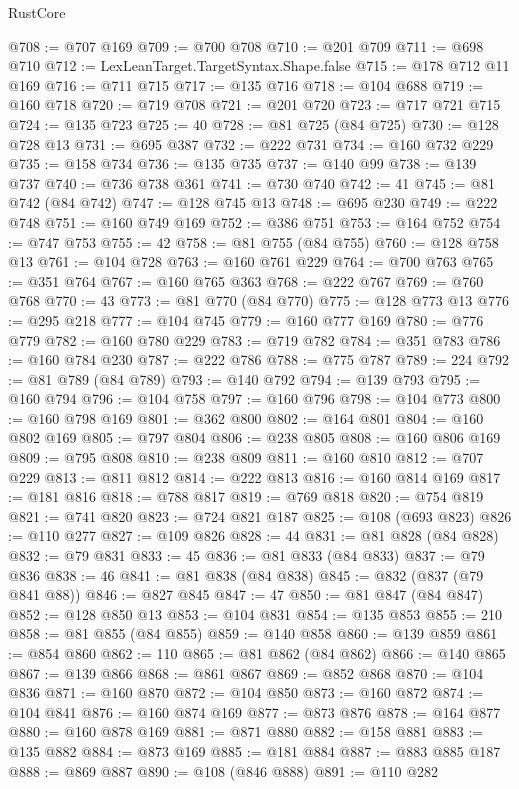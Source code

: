 \begin{lexlean}{RustCore}
\begin{coremodule}
@708 := @707 @169
@709 := @700 @708
@710 := @201 @709
@711 := @698 @710
@712 := LexLeanTarget.TargetSyntax.Shape.false
@715 := @178 @712 @11 @169
@716 := @711 @715
@717 := @135 @716
@718 := @104 @688
@719 := @160 @718
@720 := @719 @708
@721 := @201 @720
@723 := @717 @721 @715
@724 := @135 @723
@725 := 40
@728 := @81 @725 (@84 @725)
@730 := @128 @728 @13
@731 := @695 @387
@732 := @222 @731
@734 := @160 @732 @229
@735 := @158 @734
@736 := @135 @735
@737 := @140 @99
@738 := @139 @737
@740 := @736 @738 @361
@741 := @730 @740
@742 := 41
@745 := @81 @742 (@84 @742)
@747 := @128 @745 @13
@748 := @695 @230
@749 := @222 @748
@751 := @160 @749 @169
@752 := @386 @751
@753 := @164 @752
@754 := @747 @753
@755 := 42
@758 := @81 @755 (@84 @755)
@760 := @128 @758 @13
@761 := @104 @728
@763 := @160 @761 @229
@764 := @700 @763
@765 := @351 @764
@767 := @160 @765 @363
@768 := @222 @767
@769 := @760 @768
@770 := 43
@773 := @81 @770 (@84 @770)
@775 := @128 @773 @13
@776 := @295 @218
@777 := @104 @745
@779 := @160 @777 @169
@780 := @776 @779
@782 := @160 @780 @229
@783 := @719 @782
@784 := @351 @783
@786 := @160 @784 @230
@787 := @222 @786
@788 := @775 @787
@789 := 224
@792 := @81 @789 (@84 @789)
@793 := @140 @792
@794 := @139 @793
@795 := @160 @794
@796 := @104 @758
@797 := @160 @796
@798 := @104 @773
@800 := @160 @798 @169
@801 := @362 @800
@802 := @164 @801
@804 := @160 @802 @169
@805 := @797 @804
@806 := @238 @805
@808 := @160 @806 @169
@809 := @795 @808
@810 := @238 @809
@811 := @160 @810
@812 := @707 @229
@813 := @811 @812
@814 := @222 @813
@816 := @160 @814 @169
@817 := @181 @816
@818 := @788 @817
@819 := @769 @818
@820 := @754 @819
@821 := @741 @820
@823 := @724 @821 @187
@825 := @108 (@693 @823)
@826 := @110 @277
@827 := @109 @826
@828 := 44
@831 := @81 @828 (@84 @828)
@832 := @79 @831
@833 := 45
@836 := @81 @833 (@84 @833)
@837 := @79 @836
@838 := 46
@841 := @81 @838 (@84 @838)
@845 := @832 (@837 (@79 @841 @88))
@846 := @827 @845
@847 := 47
@850 := @81 @847 (@84 @847)
@852 := @128 @850 @13
@853 := @104 @831
@854 := @135 @853
@855 := 210
@858 := @81 @855 (@84 @855)
@859 := @140 @858
@860 := @139 @859
@861 := @854 @860
@862 := 110
@865 := @81 @862 (@84 @862)
@866 := @140 @865
@867 := @139 @866
@868 := @861 @867
@869 := @852 @868
@870 := @104 @836
@871 := @160 @870
@872 := @104 @850
@873 := @160 @872
@874 := @104 @841
@876 := @160 @874 @169
@877 := @873 @876
@878 := @164 @877
@880 := @160 @878 @169
@881 := @871 @880
@882 := @158 @881
@883 := @135 @882
@884 := @873 @169
@885 := @181 @884
@887 := @883 @885 @187
@888 := @869 @887
@890 := @108 (@846 @888)
@891 := @110 @282

\end{coremodule}
\end{lexlean}
